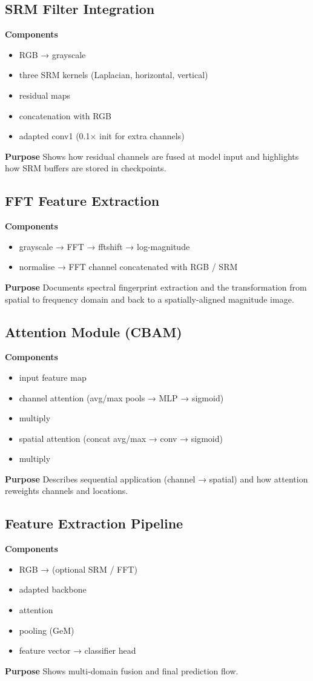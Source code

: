 \documentclass[11pt]{report}
\begin{document}
\subsection{SRM Filter Integration}
\textbf{Components}
\begin{itemize}
  \item RGB → grayscale
  \item three SRM kernels (Laplacian, horizontal, vertical)
  \item residual maps
  \item concatenation with RGB
  \item adapted conv1 (0.1× init for extra channels)
\end{itemize}
\textbf{Purpose}
Shows how residual channels are fused at model input and highlights how SRM buffers are stored in checkpoints.

\subsection{FFT Feature Extraction}
\textbf{Components}
\begin{itemize}
  \item grayscale → FFT → fftshift → log-magnitude
  \item normalise → FFT channel concatenated with RGB / SRM
\end{itemize}
\textbf{Purpose}
Documents spectral fingerprint extraction and the transformation from spatial to frequency domain and back to a spatially-aligned magnitude image.

\subsection{Attention Module (CBAM)}
\textbf{Components}
\begin{itemize}
  \item input feature map
  \item channel attention (avg/max pools → MLP → sigmoid)
  \item multiply
  \item spatial attention (concat avg/max → conv → sigmoid)
  \item multiply
\end{itemize}
\textbf{Purpose}
Describes sequential application (channel → spatial) and how attention reweights channels and locations.

\subsection{Feature Extraction Pipeline}
\textbf{Components}
\begin{itemize}
  \item RGB → (optional SRM / FFT)
  \item adapted backbone
  \item attention
  \item pooling (GeM)
  \item feature vector → classifier head
\end{itemize}
\textbf{Purpose}
Shows multi-domain fusion and final prediction flow.
\end{document}
